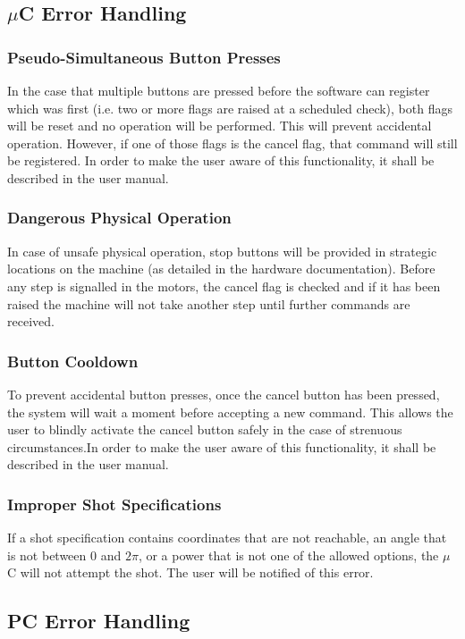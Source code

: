\documentclass[titlepage]{article}
\begin{document}
\subsection{$\mu$C Error Handling}
\subsubsection{Pseudo-Simultaneous Button Presses}
In the case that multiple buttons are pressed before the software can register which was first (i.e. two or more flags are raised at a scheduled check), both flags will be reset and no operation will be performed. This will prevent accidental operation. However, if one of those flags is the cancel flag, that command will still be registered. In order to make the user aware of this functionality, it shall be described in the user manual.
\subsubsection{Dangerous Physical Operation}
In case of unsafe physical operation, stop buttons will be provided in strategic locations on the machine (as detailed in the hardware documentation). Before any step is signalled in the motors, the cancel flag is checked and if it has been raised the machine will not take another step until further commands are received.
\subsubsection{Button Cooldown}
To prevent accidental button presses, once the cancel button has been pressed, the system will wait a moment before accepting a new command. This allows the user to blindly activate the cancel button safely in the case of strenuous circumstances.In order to make the user aware of this functionality, it shall be described in the user manual.
\subsubsection{Improper Shot Specifications}
If a shot specification contains coordinates that are not reachable, an angle that is not between 0 and $2\pi$, or a power that is not one of the allowed options, the $\mu$C will not attempt the shot. The user will be notified of this error.
\subsection{PC Error Handling}
\end{document}
